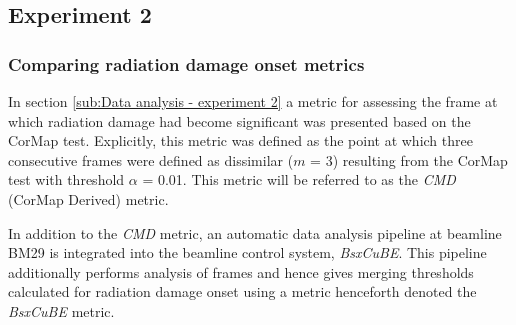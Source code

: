 \subsection{Experiment 2}
\label{sub:Experiment 2 - Results}

\subsubsection{Comparing radiation damage onset metrics}
\label{subs:Comparing radiation damage onset metrics}
In section \ref{sub:Data analysis - experiment 2} a metric for assessing the frame at which radiation damage had become significant was presented based on the CorMap test.
Explicitly, this metric was defined as the point at which three consecutive frames were defined as dissimilar ($m$ = 3) resulting from the CorMap test with threshold $\alpha$ = 0.01.
This metric will be referred to as the \textit{CMD} (CorMap Derived) metric.

In addition to the \textit{CMD} metric, an automatic data analysis pipeline at beamline BM29 is integrated into the beamline control system, \textit{BsxCuBE}.
This pipeline additionally performs analysis of frames and hence gives merging thresholds calculated for radiation damage onset using a metric henceforth denoted the \textit{BsxCuBE} metric.

